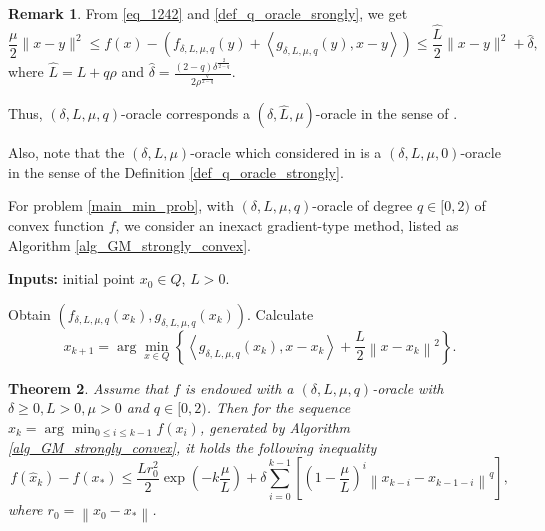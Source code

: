 \documentclass[11pt]{amsart}
\newtheorem{theorem}{Theorem}[section]
\theoremstyle{definition}
\newtheorem{remark}[theorem]{Remark}
\numberwithin{equation}{section}
\begin{document}
\begin{remark}
From \eqref{eq_1242} and \eqref{def_q_oracle_srongly}, we get
\begin{equation*}
   \frac{\mu}{2} \|x - y\|^2  \leq f(x) - \left(f_{\delta, L, \mu, q}(y) + \left \langle g_{\delta, L, \mu, q} (y), x - y  \right \rangle  \right) \leq \frac{\widehat{L}}{2} \|x - y\|^2 + \widehat{\delta},
\end{equation*}
where $\widehat{L} = L + q \rho$ and $\widehat{\delta} = \frac{(2-q) \delta^{\frac{2}{2-q}}}{2 \rho^{\frac{q}{2-q}}}$. 

Thus, $(\delta, L, \mu, q)$-oracle corresponds a $(\widehat{\delta}, \widehat{L}, \mu)$-oracle in the sense of \cite{Devolder2013strongly}.

Also, note that the $(\delta, L, \mu)$-oracle which considered in \cite{Devolder2013strongly} is a $(\delta, L, \mu, 0)$-oracle in the sense of the Definition \ref{def_q_oracle_strongly}.
\end{remark}

For problem \eqref{main_min_prob}, with $(\delta, L,\mu, q)$-oracle of degree $q \in [0,2)$ of convex function $f$, we consider an inexact gradient-type method, listed as Algorithm \ref{alg_GM_strongly_convex}. 

\begin{algorithm}[!ht]
\caption{Inexact gradient method with $(\delta, L, \mu, q)$-oracle.}\label{alg_GM_strongly_convex}
\textbf{Inputs:} initial point $x_0  \in Q$, $L>0$. 
\hspace*{\algorithmicindent}
\begin{algorithmic}[1]
\STATE Obtain $\left(f_{\delta, L,\mu, q}(x_k), g_{\delta, L, \mu, q}(x_k)\right)$.
\STATE Calculate 
    \begin{equation}\label{prob_alg_3}
        x_{k+1} = \arg\min_{x \in Q } \left\{ \left\langle g_{\delta, L, \mu, q} (x_k), x- x_k \right\rangle + \frac{L}{2} \left \|x - x_k\right\|^2 \right\}.
    \end{equation}
\ENDFOR
\end{algorithmic}
\end{algorithm}

\begin{theorem}
Assume that $f$ is endowed with a $(\delta, L, \mu, q)$-oracle with $\delta \geq 0, L>0, \mu >0$ and $q \in [0, 2)$. Then for the sequence $\widehat{x}_k = \arg\min_{0 \leq i \leq k-1} f(x_i)$, generated by Algorithm \ref{alg_GM_strongly_convex}, it holds the following inequality
\begin{equation}\label{rate_strongly_lin}
    f\left(\widehat{x}_k\right) - f(x_*) \leq \frac{L r_0^2}{2} \exp \left(- k \frac{\mu}{L}\right) + \delta \sum_{ i = 0}^{k-1} \left[\left(1 - \frac{\mu}{L}\right)^i \left \|x_{k - i} - x_{k - 1 - i}\right\|^q\right],
\end{equation}
where $r_0 = \left\|x_0 - x_*\right\|$. 
\end{theorem}
\end{document}
